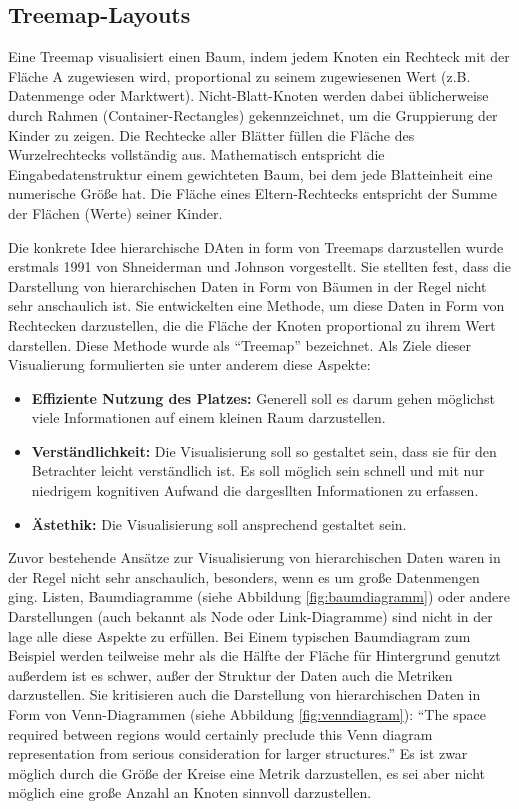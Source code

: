 \subsection{Treemap-Layouts} \label{sec:Treemap}

Eine Treemap visualisiert einen Baum, indem jedem Knoten ein Rechteck mit der Fläche A zugewiesen wird, proportional zu seinem zugewiesenen Wert (z.B. Datenmenge oder Marktwert). Nicht-Blatt-Knoten werden dabei üblicherweise durch Rahmen (Container-Rectangles) gekennzeichnet, um die Gruppierung der Kinder zu zeigen. \cite{bruls2000squarified} Die Rechtecke aller Blätter füllen die Fläche des Wurzelrechtecks vollständig aus. Mathematisch entspricht die Eingabedatenstruktur einem gewichteten Baum, bei dem jede Blatteinheit eine numerische Größe hat. Die Fläche eines Eltern-Rechtecks entspricht der Summe der Flächen (Werte) seiner Kinder.

Die konkrete Idee hierarchische DAten in form von Treemaps darzustellen wurde erstmals 1991 von Shneiderman und Johnson \cite{johnson1991tree} vorgestellt. Sie stellten fest, dass die Darstellung von hierarchischen Daten in Form von Bäumen in der Regel nicht sehr anschaulich ist. Sie entwickelten eine Methode, um diese Daten in Form von Rechtecken darzustellen, die die Fläche der Knoten proportional zu ihrem Wert darstellen. Diese Methode wurde als \enquote{Treemap} bezeichnet. Als Ziele dieser Visualierung formulierten sie unter anderem diese Aspekte:
\begin{itemize}
    \item \textbf{Effiziente Nutzung des Platzes:} Generell soll es darum gehen möglichst viele Informationen auf einem kleinen Raum darzustellen.
    \item \textbf{Verständlichkeit:} Die Visualisierung soll so gestaltet sein, dass sie für den Betrachter leicht verständlich ist. Es soll möglich sein schnell und mit nur niedrigem kognitiven Aufwand die dargesllten Informationen zu erfassen.
    \item \textbf{Ästethik:} Die Visualisierung soll ansprechend gestaltet sein.
\end{itemize}

Zuvor bestehende Ansätze zur Visualisierung von hierarchischen Daten waren in der Regel nicht sehr anschaulich, besonders, wenn es um große Datenmengen ging. Listen, Baumdiagramme (siehe Abbildung \ref{fig:baumdiagramm}) oder andere Darstellungen (auch bekannt als Node oder Link-Diagramme) sind nicht in der lage alle diese Aspekte zu erfüllen. Bei Einem typischen Baumdiagram zum Beispiel werden teilweise mehr als die Hälfte der Fläche für Hintergrund genutzt \cite[3]{johnson1991tree} außerdem ist es schwer, außer der Struktur der Daten auch die Metriken darzustellen. Sie kritisieren auch die Darstellung von hierarchischen Daten in Form von Venn-Diagrammen (siehe Abbildung \ref{fig:venndiagram}): \enquote{The space required between regions would certainly preclude this Venn diagram representation from serious consideration for larger structures.}\cite[5]{johnson1991tree} Es ist zwar möglich durch die Größe der Kreise eine Metrik darzustellen, es sei aber nicht möglich eine große Anzahl an Knoten sinnvoll darzustellen. 

